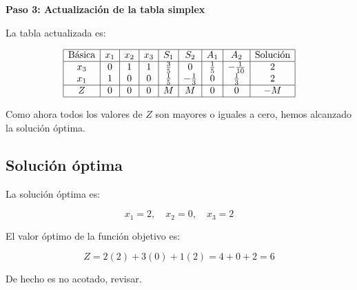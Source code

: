 \documentclass{article}
\begin{document}
\textbf{Paso 3: Actualización de la tabla simplex}

La tabla actualizada es:

\[
\begin{array}{|c|c|c|c|c|c|c|c|c|}
\hline
\text{Básica} & x_1 & x_2 & x_3 & S_1 & S_2 & A_1 & A_2 & \text{Solución} \\
\hline
x_3 & 0 & 1 & 1 & \frac{3}{5} & 0 & \frac{1}{5} & -\frac{1}{10} & 2 \\
x_1 & 1 & 0 & 0 & \frac{1}{5} & -\frac{1}{3} & 0 & \frac{1}{3} & 2 \\
\hline
Z & 0 & 0 & 0 & M & M & 0 & 0 & -M \\
\hline
\end{array}
\]

Como ahora todos los valores de \(Z\) son mayores o iguales a cero, hemos alcanzado la solución óptima.

\subsection*{Solución óptima}

La solución óptima es:

\[
x_1 = 2, \quad x_2 = 0, \quad x_3 = 2
\]

El valor óptimo de la función objetivo es:

\[
Z = 2(2) + 3(0) + 1(2) = 4 + 0 + 2 = 6
\]

De hecho es no acotado, revisar.
\end{document}
